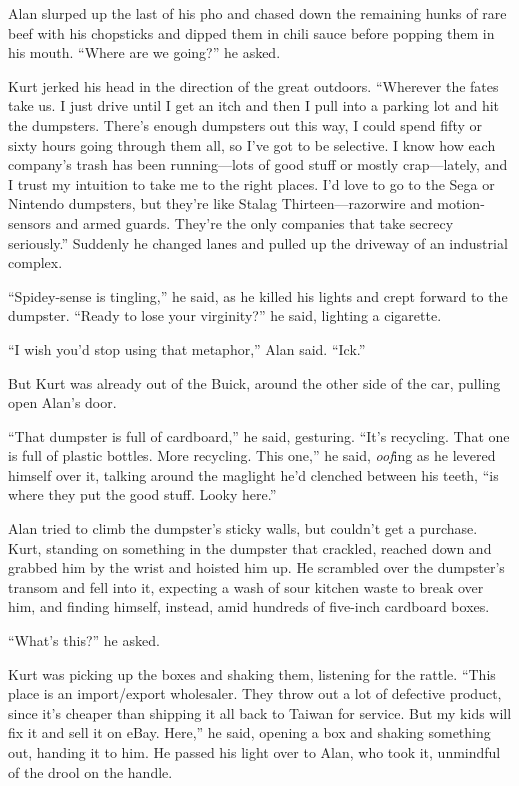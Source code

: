 Alan slurped up the last of his pho and chased down the remaining
hunks of rare beef with his chopsticks and dipped them in chili sauce
before popping them in his mouth.  ``Where are we going?'' he asked.

Kurt jerked his head in the direction of the great outdoors. 
``Wherever the fates take us.  I just drive until I get an itch and
then I pull into a parking lot and hit the dumpsters.  There's enough
dumpsters out this way, I could spend fifty or sixty hours going
through them all, so I've got to be selective.  I know how each
company's trash has been running---lots of good stuff or mostly
crap---lately, and I trust my intuition to take me to the right
places.  I'd love to go to the Sega or Nintendo dumpsters, but they're
like Stalag Thirteen---razorwire and motion-sensors and armed guards. 
They're the only companies that take secrecy seriously.'' Suddenly he
changed lanes and pulled up the driveway of an industrial complex.

``Spidey-sense is tingling,'' he said, as he killed his lights and
crept forward to the dumpster.  ``Ready to lose your virginity?'' he
said, lighting a cigarette.

``I wish you'd stop using that metaphor,'' Alan said.  ``Ick.''

But Kurt was already out of the Buick, around the other side of the
car, pulling open Alan's door.

``That dumpster is full of cardboard,'' he said, gesturing.  ``It's
recycling.  That one is full of plastic bottles.  More recycling. 
This one,'' he said, \textit{oof}ing as he levered himself over it,
talking around the maglight he'd clenched between his teeth, ``is
where they put the good stuff.  Looky here.''

Alan tried to climb the dumpster's sticky walls, but couldn't get a
purchase.  Kurt, standing on something in the dumpster that crackled,
reached down and grabbed him by the wrist and hoisted him up.  He
scrambled over the dumpster's transom and fell into it, expecting a
wash of sour kitchen waste to break over him, and finding himself,
instead, amid hundreds of five-inch cardboard boxes.

``What's this?'' he asked.

Kurt was picking up the boxes and shaking them, listening for the
rattle.  ``This place is an import/export wholesaler.  They throw out
a lot of defective product, since it's cheaper than shipping it all
back to Taiwan for service.  But my kids will fix it and sell it on
eBay.  Here,'' he said, opening a box and shaking something out,
handing it to him.  He passed his light over to Alan, who took it,
unmindful of the drool on the handle.

